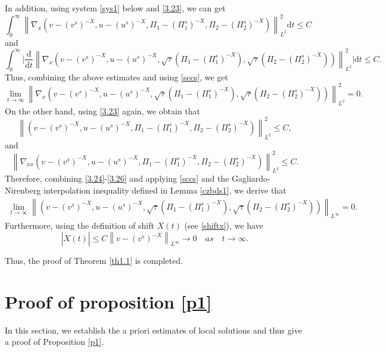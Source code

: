 \documentclass[10pt,reqno]{amsart}
\numberwithin{equation}{section}
\newcommand{\dif}{\mathrm{d}}
\begin{document}
In addition, using system \eqref{sys1} below and \eqref{3.23}, we can get
$$
\int_0^{\infty}\left\|\nabla_{x}(v-(v^s)^{-X}, u-(u^s)^{-X}, \Pi_1-(\Pi_1^s)^{-X}, \Pi_2-(\Pi_2^s)^{-X})\right\|_{L^2}^2\dif t \le C
$$
and
$$\int_0^{\infty} \Big|\frac{\dif}{\dif t}\left\|\nabla_{x}(v-(v^s)^{-X}, u-(u^s)^{-X}, \sqrt\tau(\Pi_1-(\Pi_1^s)^{-X}), \sqrt\tau(\Pi_2-(\Pi_2^s)^{-X}))\right\|_{L^2}^2 \Big |\dif t \le C.$$
Thus, combining the above estimates and using \eqref{sccs}, we get
\begin{equation}\label{3.24}
\lim\limits_{t\rightarrow\infty}\left\|\nabla_{x}(v-(v^s)^{-X}, u-(u^s)^{-X}, \sqrt\tau(\Pi_1-(\Pi_1^s)^{-X}), \sqrt\tau(\Pi_2-(\Pi_2^s)^{-X}))\right\|_{L^2}^2=0.
\end{equation}
On the other hand, using \eqref{3.23} again, we obtain that
\begin{equation}\label{3.25}
\left\|(v-(v^s)^{-X}, u-(u^s)^{-X}, \Pi_1-(\Pi_1^s)^{-X}, \Pi_2-(\Pi_2^s)^{-X})\right\|_{L^2}^2\le C,
\end{equation}
and
\begin{equation}\label{3.26}
\left\|\nabla_{xx}(v-(v^s)^{-X}, u-(u^s)^{-X}, \Pi_1-(\Pi_1^s)^{-X}, \Pi_2-(\Pi_2^s)^{-X})\right\|_{L^2}^2\le C.
\end{equation}
Therefore, combining \eqref{3.24}-\eqref{3.26} and applying \eqref{sccs} and the Gagliardo-Nirenberg interpolation inequality defined in Lemma \ref{czbds1}, we derive that
\begin{align*}
\lim\limits_{t\rightarrow\infty}\left\|(v-(v^s)^{-X}, u-(u^s)^{-X}, \sqrt\tau(\Pi_1-(\Pi_1^s)^{-X}), \sqrt\tau(\Pi_2-(\Pi_2^s)^{-X}))\right\|_{L^\infty}=0.
\end{align*}
Furthermore, using the definition of shift $X(t)$ (see \eqref{shiftx}), we have
\begin{equation}\nonumber
|\dot{X}(t)|\leq C\left\|v-(v^s)^{-X}\right\|_{L^{\infty}}\rightarrow0\quad as \quad t\rightarrow\infty.
\end{equation}

Thus, the proof of Theorem \ref{th1.1} is completed.






\section{Proof of proposition \ref{p1}}
In this section, we establish the a priori estimates  of local solutions and thus give a proof of Proposition \ref{p1}.
\end{document}
